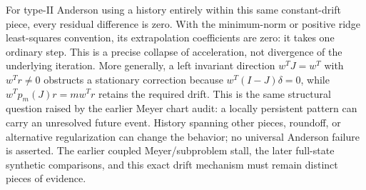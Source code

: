 For type-II Anderson using a history entirely within this same constant-drift
piece, every residual difference is zero. With the minimum-norm or positive
ridge least-squares convention, its extrapolation coefficients are zero:
it takes one ordinary step. This is a precise collapse of acceleration,
not divergence of the underlying iteration. More generally, a left invariant direction $w^TJ=w^T$ with $w^Tr\ne0$
obstructs a stationary correction because $w^T(I-J)\delta=0$, while
$w^Tp_m(J)r=mw^Tr$ retains the required drift. This is the same structural
question raised by the earlier Meyer chart audit: a locally persistent
pattern can carry an unresolved future event. History spanning other pieces,
roundoff, or alternative regularization can change the behavior; no universal
Anderson failure is asserted. The earlier coupled Meyer/subproblem stall,
the later full-state synthetic comparisons, and this exact drift mechanism
must remain distinct pieces of evidence.


